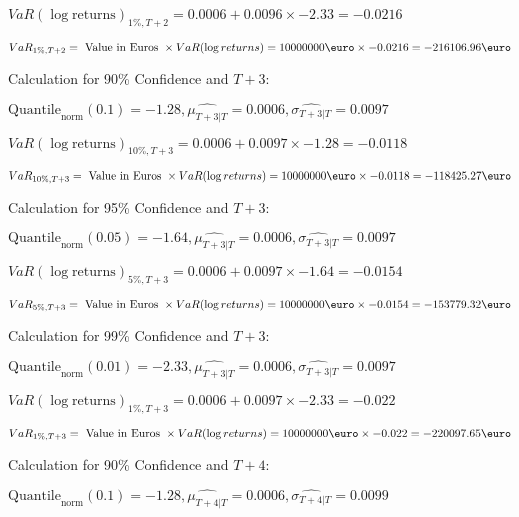 \indent\indent $VaR(\log \text{returns})_{1\%, T + 2} = 0.0006 + 0.0096\times-2.33 = -0.0216$

\indent\indent $VaR_{1\%, T + 2} = \text{ Value in Euros } \times VaR(\log returns) = 10 000 000 \text{\euro} \times-0.0216 = -216106.96 \text{\euro}$\newline




Calculation for 90\% Confidence and $T+3$:

\indent\indent $\text{Quantile}_\text{norm}(0.1) = -1.28,\hat{\mu_{T+3|T}} = 0.0006, \hat{\sigma_{T+3|T}} = 0.0097$

\indent\indent $VaR(\log \text{returns})_{10\%, T + 3} = 0.0006 + 0.0097\times-1.28 = -0.0118$

\indent\indent $VaR_{10\%, T + 3} = \text{ Value in Euros } \times VaR(\log returns) = 10 000 000 \text{\euro} \times-0.0118 = -118425.27 \text{\euro}$\newline




Calculation for 95\% Confidence and $T+3$:

\indent\indent $\text{Quantile}_\text{norm}(0.05) = -1.64,\hat{\mu_{T+3|T}} = 0.0006, \hat{\sigma_{T+3|T}} = 0.0097$

\indent\indent $VaR(\log \text{returns})_{5\%, T + 3} = 0.0006 + 0.0097\times-1.64 = -0.0154$

\indent\indent $VaR_{5\%, T + 3} = \text{ Value in Euros } \times VaR(\log returns) = 10 000 000 \text{\euro} \times-0.0154 = -153779.32 \text{\euro}$\newline




Calculation for 99\% Confidence and $T+3$:

\indent\indent $\text{Quantile}_\text{norm}(0.01) = -2.33,\hat{\mu_{T+3|T}} = 0.0006, \hat{\sigma_{T+3|T}} = 0.0097$

\indent\indent $VaR(\log \text{returns})_{1\%, T + 3} = 0.0006 + 0.0097\times-2.33 = -0.022$

\indent\indent $VaR_{1\%, T + 3} = \text{ Value in Euros } \times VaR(\log returns) = 10 000 000 \text{\euro} \times-0.022 = -220097.65 \text{\euro}$\newline




Calculation for 90\% Confidence and $T+4$:

\indent\indent $\text{Quantile}_\text{norm}(0.1) = -1.28,\hat{\mu_{T+4|T}} = 0.0006, \hat{\sigma_{T+4|T}} = 0.0099$


